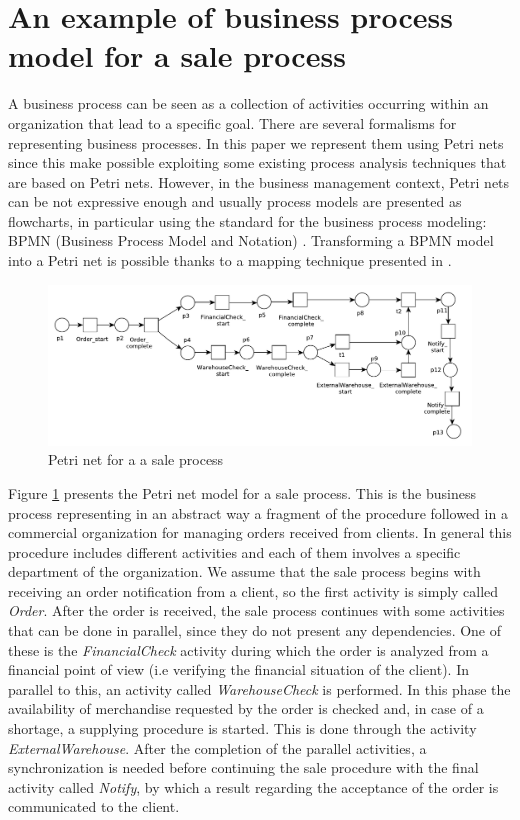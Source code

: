 \documentclass{llncs}
\begin{document}
\section{An example of business process model for a sale process}\label{example}
A business process can be seen as a collection of activities occurring within an organization that lead to a specific goal. There are several formalisms for representing business processes. In this paper we represent them using Petri nets \cite{8}\cite{10} since this make possible exploiting some existing process analysis techniques that are based on Petri nets. However, in the business management context, Petri nets can be not expressive enough and usually process models are presented as flowcharts, in particular using the standard for the business process modeling: BPMN (Business Process Model and Notation) \cite{9}. Transforming a BPMN model into a Petri net is possible thanks to a mapping technique presented in \cite{12}\cite{2}.
\begin{figure}[h]
\includegraphics[width=360pt]
{./items/Sales_PN.pdf}
\caption{Petri net for a a sale process}
\label{pnet}
\end{figure}

Figure \ref{pnet} presents the Petri net model for a sale process. This is the business process representing in an abstract way a fragment of the procedure followed in a commercial organization for managing orders received from clients. In general this procedure includes different activities and each of them involves a specific department of the organization. We assume that the sale process begins with receiving an order notification from a client, so the first activity is simply called \emph{Order}. After the order is received, the sale process continues with some activities that can be done in parallel, since they do not present any dependencies. One of these is the \emph{FinancialCheck} activity during which the order is analyzed from a financial point of view (i.e verifying the financial situation of the client). In parallel to this, an activity called \emph{WarehouseCheck} is performed. In this phase the availability of merchandise requested by the order is checked and, in case of a shortage, a supplying procedure is started. This is done through the activity \emph{ExternalWarehouse}. After the completion of the  parallel activities, a synchronization is needed before continuing the sale procedure with the final activity called \emph{Notify}, by which a result regarding the acceptance of the order is communicated to the client.
\end{document}
